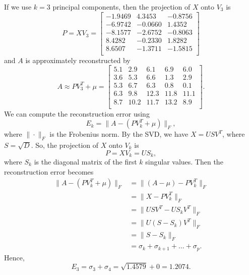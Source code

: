 \begin{example}
    If we use \(k = 3\) principal components, then the projection of \(X\) onto \(V_3\) is
    \[P = XV_3 = \begin{bmatrix}
        -1.9469 &  4.3453 & -0.8756 \\
        -6.9742 & -0.0660 &  1.4352 \\
        -8.1577 & -2.6752 & -0.8063 \\
            8.4282 & -0.2330 &  1.8282 \\
            8.6507 & -1.3711 & -1.5815 \\
    \end{bmatrix}\]
    and \(A\) is approximately reconstructed by
    \[A \approx P V_3^T + \mu = \begin{bmatrix}
        5.1 &  2.9 &  6.1 &  6.9 &  6.0 \\
        3.6 &  5.3 &  6.6 &  1.3 &  2.9 \\
        5.3 &  6.7 &  6.3 &  0.8 &  0.1 \\
        6.3 &  9.8 & 12.3 & 11.8 & 11.1 \\
        8.7 & 10.2 & 11.7 & 13.2 &  8.9 \\
    \end{bmatrix}.\]
    We can compute the reconstruction error using
    \begin{equation*}%
        E_k = \|A - (PV_k^T + \mu)\|_F,
    \end{equation*}
    where \(\|\cdot\|_F\) is the Frobenius norm.
    By the SVD, we have \(X = USV^T\), where \(S = \sqrt{D}\).
    So, the projection of \(X\) onto \(V_k\) is \[P = XV_k = US_k,\] where \(S_k\) is the diagonal matrix of the first \(k\) singular values.
    Then the reconstruction error becomes
    \begin{align*}
        \|A - (PV_k^T + \mu)\|_F
        &= \|(A - \mu) - PV_k^T\|_F \\
        &= \|X - PV_k^T\|_F \\
        &= \|USV^T - US_kV^T\|_F \\
        &= \|U(S - S_k)V^T\|_F \\
        &= \|S-S_k\|_F \\
        &= \sigma_k + \sigma_{k+1} + \dots + \sigma_{p}.
    \end{align*}
    Hence,
    \[E_3 = \sigma_3 + \sigma_4 = \sqrt{1.4579} + 0 = 1.2074.\]
\end{example}


